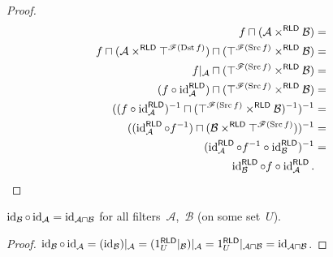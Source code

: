 \begin{proof}
~
\begin{align*}
f\sqcap(\mathcal{A}\times^{\mathsf{RLD}}\mathcal{B}) & =\\
f\sqcap(\mathcal{A}\times^{\mathsf{RLD}}\top^{\mathscr{F}(\operatorname{Dst} f)})\sqcap(\top^{\mathscr{F}(\operatorname{Src} f)}\times^{\mathsf{RLD}}\mathcal{B}) & =\\
f|_{\mathcal{A}}\sqcap(\top^{\mathscr{F}(\operatorname{Src} f)}\times^{\mathsf{RLD}}\mathcal{B}) & =\\
(f\circ\operatorname{id}_{\mathcal{A}}^{\mathsf{\mathsf{RLD}}})\sqcap(\top^{\mathscr{F}(\operatorname{Src} f)}\times^{\mathsf{RLD}}\mathcal{B}) & =\\
((f\circ\operatorname{id}_{\mathcal{A}}^{\mathsf{\mathsf{RLD}}})^{-1}\sqcap(\top^{\mathscr{F}(\operatorname{Src} f)}\times^{\mathsf{RLD}}\mathcal{B})^{-1})^{-1} & =\\
((\operatorname{id}_{\mathcal{A}}^{\mathsf{\mathsf{RLD}}}\circ f^{-1})\sqcap(\mathcal{B}\times^{\mathsf{RLD}}\top^{\mathscr{F}(\operatorname{Src} f)}))^{-1} & =\\
(\operatorname{id}_{\mathcal{A}}^{\mathsf{\mathsf{RLD}}}\circ f^{-1}\circ\operatorname{id}_{\mathcal{B}}^{\mathsf{\mathsf{RLD}}})^{-1} & =\\
\operatorname{id}_{\mathcal{B}}^{\mathsf{\mathsf{RLD}}}\circ f\circ\operatorname{id}_{\mathcal{A}}^{\mathsf{\mathsf{RLD}}}.
\end{align*}
\end{proof}

\begin{prop}\label{rld-id-comp}
$\operatorname{id}_{\mathcal{B}}\circ\operatorname{id}_{\mathcal{A}} = \operatorname{id}_{\mathcal{A}\sqcap\mathcal{B}}$ for all filters~$\mathcal{A}$,~$\mathcal{B}$ (on some set~$U$).
\end{prop}

\begin{proof}
$\operatorname{id}_{\mathcal{B}}\circ\operatorname{id}_{\mathcal{A}} =
(\operatorname{id}_{\mathcal{B}})|_{\mathcal{A}} = (1^{\mathsf{RLD}}_U|_{\mathcal{B}})|_{\mathcal{A}} = 1^{\mathsf{RLD}}_U|_{\mathcal{A}\sqcap\mathcal{B}} = 
\operatorname{id}_{\mathcal{A}\sqcap\mathcal{B}}$.
\end{proof}

